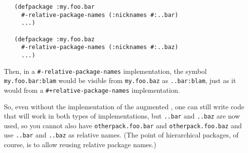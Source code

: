 \begin{verbatim}
   (defpackage :my.foo.bar
     #-relative-package-names (:nicknames #:..bar)
     ...)

   (defpackage :my.foo.baz
     #-relative-package-names (:nicknames #:..baz)
     ...)
\end{verbatim}

Then, in a \verb|#-relative-package-names| implementation, the symbol
\verb|my.foo.bar:blam| would be visible from \verb|my.foo.baz| as
\verb|..bar:blam|, just as it would from a
\verb|#+relative-package-names| implementation.

So, even without the implementation of the augmented
, one can still write \clisp{} code that will
work in both types of implementations, but \verb|..bar| and
\verb|..baz| are now used, so you cannot also have
\verb|otherpack.foo.bar| and \verb|otherpack.foo.baz| and use
\verb|..bar| and \verb|..baz| as relative names. (The point of
hierarchical packages, of course, is to allow reusing relative package
names.)

